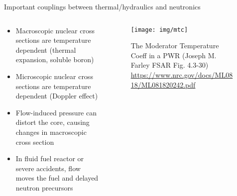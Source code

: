 \documentclass[pdf,aspectratio=169]{beamer}
\begin{document}
\begin{frame}{Important couplings between thermal/hydraulics and neutronics}
\begin{columns}
    \begin{column}{0.5\textwidth}
        \begin{itemize}
            \item Macroscopic nuclear cross sections are temperature dependent (thermal
                expansion, soluble boron)
            \item Microscopic nuclear cross sections are temperature dependent (Doppler effect)
            \item Flow-induced pressure can distort the core, causing changes in
                macroscopic cross section
            \item In fluid fuel reactor or severe accidents, flow moves the fuel and
                delayed neutron precursors
        \end{itemize}
    \end{column}
    \begin{column}{0.5\textwidth}
        \begin{figure}[ht]
        \centering
            \texttt{[image: img/mtc]}
            \caption{\tiny The Moderator Temperature Coeff in a PWR (Joseph M. Farley
            FSAR Fig. 4.3-30) \url{https://www.nrc.gov/docs/ML0818/ML081820242.pdf}}
        \end{figure}
    \end{column}
    \end{columns}
\end{frame}
\end{document}
